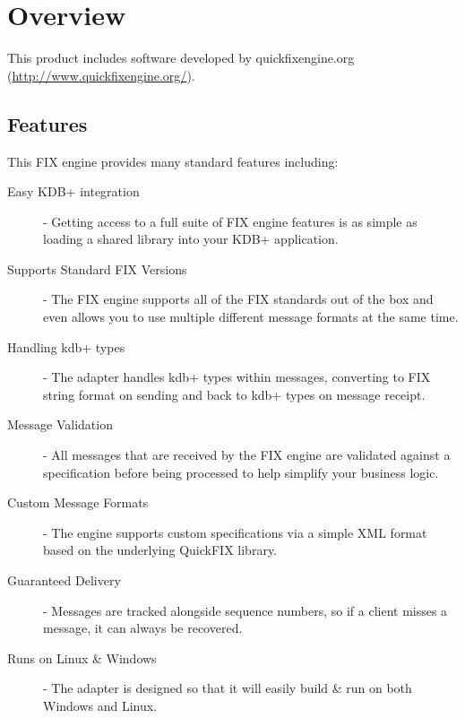 \chapter{Overview}

This product includes software developed by quickfixengine.org (\url{http://www.quickfixengine.org/}).

\section{Features}

This FIX engine provides many standard features including:

\begin{description}
	\item[Easy KDB+ integration] - Getting access to a full suite of FIX engine features is as simple as loading a shared library into your KDB+ application.
	\item[Supports Standard FIX Versions] - The FIX engine supports all of the FIX standards out of the box and even allows you to use multiple different message formats at the same time.
	\item[Handling kdb+ types] - The adapter handles kdb+ types within messages, converting to FIX string format on sending and back to kdb+ types on message receipt.
	\item[Message Validation] - All messages that are received by the FIX engine are validated against a specification before being processed to help simplify your business logic.
	\item[Custom Message Formats] - The engine supports custom specifications via a simple XML format based on the underlying QuickFIX library.
	\item[Guaranteed Delivery] - Messages are tracked alongside sequence numbers, so if a client misses a message, it can always be recovered.
	\item[Runs on Linux \& Windows] - The adapter is designed so that it will easily build \& run on both Windows and Linux.
\end{description}
